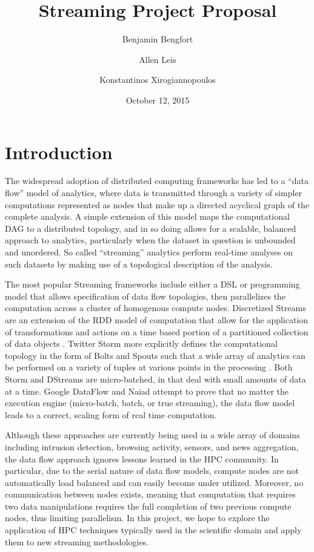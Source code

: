 \documentclass[11pt,letterpaper]{article}
\begin{document}
\title{Streaming Project Proposal}
\author[1]{Benjamin Bengfort}
\author[2]{Allen Leis}
\author[1]{Konstantinos Xirogiannopoulos}

\date{October 12, 2015}

\maketitle
\section{Introduction}

The widespread adoption of distributed computing frameworks has led to a ``data flow'' model of analytics, where data is transmitted through a variety of simpler computations represented as nodes that make up a directed acyclical graph of the complete analysis. A simple extension of this model maps the computational DAG to a distributed topology, and in so doing allows for a scalable, balanced approach to analytics, particularly when the dataset in question is unbounded and unordered. So called ``streaming'' analytics perform real-time analyses on such datasets by making use of a topological description of the analysis.

The most popular Streaming frameworks include either a DSL or programming model that allows specification of data flow topologies, then parallelizes the computation across a cluster of homogenous compute nodes. Discretized Streams are an extension of the RDD model of computation that allow for the application of transformations and actions on a time based portion of a partitioned collection of data objects \cite{zaharia2012discretized}. Twitter Storm more explicitly defines the computational topology in the form of Bolts and Spouts such that a wide array of analytics can be performed on a variety of tuples at various points in the processing \cite{toshniwal2014storm}. Both Storm and DStreams are micro-batched, in that deal with small amounts of data at a time. Google DataFlow \cite{akidau2015dataflow} and Naiad \cite{murray2013naiad} attempt to prove that no matter the execution engine (micro-batch, batch, or true streaming), the data flow model leads to a correct, scaling form of real time computation.

Although these approaches are currently being used in a wide array of domains including intrusion detection, browsing activity, sensors, and news aggregation, the data flow approach ignores lessons learned in the HPC community. In particular, due to the serial nature of data flow models, compute nodes are not automatically load balanced and can easily become under utilized. Moreover, no communication between nodes exists, meaning that computation that requires two data manipulations requires the full completion of two previous compute nodes, thus limiting parallelism. In this project, we hope to explore the application of HPC techniques typically used in the scientific domain and apply them to new streaming methodologies.
\end{document}
